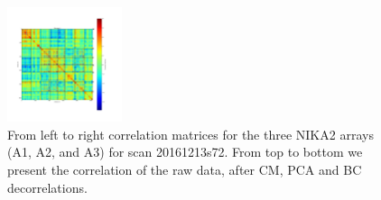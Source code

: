 \begin{figure}[ht]
\begin{center}
\includegraphics[width=0.3\textwidth]{Figures/DarkTests/corrmat_TOI_BC_array_3_20161213s72.pdf}
\end{center}
\caption{From left to right correlation matrices for the three NIKA2 arrays (A1, A2, and A3) for scan 20161213s72. From top to bottom we present the correlation of the raw data, after CM, PCA and BC decorrelations. \label{corrs72}}
\end{figure}


